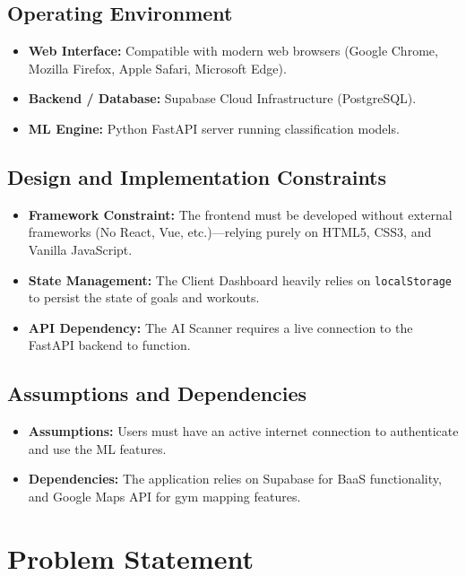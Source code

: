 \documentclass[12pt,a4paper]{article}
\begin{document}
\subsection{Operating Environment}
\begin{itemize}
    \item \textbf{Web Interface:} Compatible with modern web browsers (Google Chrome, Mozilla Firefox, Apple Safari, Microsoft Edge).
    \item \textbf{Backend / Database:} Supabase Cloud Infrastructure (PostgreSQL).
    \item \textbf{ML Engine:} Python FastAPI server running classification models.
\end{itemize}

\subsection{Design and Implementation Constraints}
\begin{itemize}
    \item \textbf{Framework Constraint:} The frontend must be developed without external frameworks (No React, Vue, etc.)—relying purely on HTML5, CSS3, and Vanilla JavaScript.
    \item \textbf{State Management:} The Client Dashboard heavily relies on \texttt{localStorage} to persist the state of goals and workouts.
    \item \textbf{API Dependency:} The AI Scanner requires a live connection to the FastAPI backend to function.
\end{itemize}

\subsection{Assumptions and Dependencies}
\begin{itemize}
    \item \textbf{Assumptions:} Users must have an active internet connection to authenticate and use the ML features. 
    \item \textbf{Dependencies:} The application relies on Supabase for BaaS functionality, and Google Maps API for gym mapping features.
\end{itemize}

\section{Problem Statement}
\end{document}
